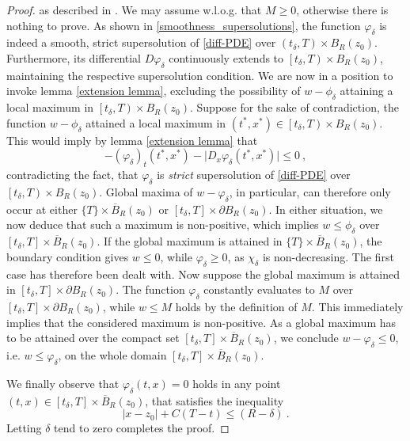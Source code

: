 \begin{theorem}
\begin{proof}
				as described in \cite[p.~73]{barles}. We may assume w.l.o.g. that $ M \geq 0 $, otherwise there is nothing to prove. As shown in \ref{smoothness_supersolutions}, the function $ \varphi_{\delta} $ is indeed a smooth, strict supersolution of \eqref{diff-PDE} over $ \left(t_{\delta}, T \right) \times B_R(z_0) $. Furthermore, its differential $ D \varphi_{\delta} $ continuously extends to $ \left[t_{\delta}, T \right) \times B_R(z_0) $, maintaining the respective supersolution condition. We are now in a position to invoke lemma \ref{extension lemma}, excluding the possibility of $ w - \phi_{\delta} $ attaining a local maximum in $ \left[t_{\delta}, T \right) \times B_R (z_0) $. Suppose for the sake of contradiction, the function $ w - \phi_{\delta} $ attained a local maximum in $ (t^{*}, x^{*}) \in \left[t_{\delta}, T \right) \times B_R (z_0) $. This would imply by lemma \ref{extension lemma} that
				\begin{equation*}
					-(\varphi_{\delta})_t(t^*, x^*) - \lvert D_x \varphi_{\delta}(t^*, x^*) \rvert \leq 0 \ ,
				\end{equation*}
				contradicting the fact, that $ \varphi_{\delta} $ is \emph{strict} supersolution of \eqref{diff-PDE} over $ \left[t_{\delta}, T \right) \times B_R (z_0) $.
				Global maxima of $ w - \varphi_{\delta} $, in particular, can therefore only occur at either $ \{T\} \times \overline{B}_R (z_0) $ or $ \left[t_{\delta}, T\right] \times \partial B_R(z_0) $. In either situation, we now deduce that such a maximum is non-positive, which implies $ w \leq \phi_{\delta} $ over $  \left[ t_{\delta}, T \right] \times \overline{B}_R (z_0) $. If the global maximum is attained in $ \{T\} \times \overline{B}_R (z_0) $, the boundary condition gives $ w \leq 0 $, while $ \varphi_{\delta} \geq 0 $, as $ \chi_{\delta} $ is non-decreasing. The first case has therefore been dealt with. Now suppose the global maximum is attained in $ \left[t_{\delta}, T\right] \times \partial B_R(z_0) $. The function $ \varphi_{\delta} $ constantly evaluates to $ M $ over $ \left[t_{\delta}, T\right] \times \partial B_R(z_0) $, while $ w \leq M $ holds by the definition of $ M $. This immediately implies that the considered maximum is non-positive. As a global maximum has to be attained over the compact set $ \left[t_{\delta}, T\right] \times \overline{B}_R (z_0)$, we conclude $ w - \varphi_{\delta} \leq 0$, i.e. $ w \leq \varphi_{\delta} $, on the whole domain $ \left[t_{\delta}, T\right] \times \overline{B}_R (z_0) $.
				
				We finally observe that $ \varphi_{\delta}(t, x) = 0 $ holds in any point $ (t, x) \in \left[t_{\delta}, T\right] \times \overline{B}_R(z_0)$, that satisfies the inequality
				\begin{equation*}
					\lvert x - z_0 \rvert + C(T - t) \leq (R - \delta) \ .
				\end{equation*}
				Letting $ \delta $ tend to zero completes the proof.
			\end{proof}
		\end{theorem}